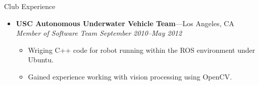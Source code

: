\documentclass[8pt,oneside]{article}
\newenvironment{ressection}[1]{
	\vspace{4pt}
	{\fontfamily{phv}\selectfont\large#1}
	\begin{itemize}
	\vspace{3pt}
}{
	\end{itemize}
}
\newcommand{\resitem}[1]{
	\vspace{-4pt}
	\item \begin{flushleft} #1 \end{flushleft}
}
\newcommand{\ressubitem}[1]{
	\vspace{-1pt}
	\item \begin{flushleft} #1 \end{flushleft}
}
\newcommand{\resbigitem}[3]{
	\vspace{-5pt}
	\item
	\textbf{#1}---#2 \\
	\textit{#3}
}
\newcommand{\resshortbigitem}[2]{
	\vspace{-5pt}
	\item
	\textbf{#1}---#2
}
\newenvironment{ressubsec}[3]{
	\resbigitem{#1}{#2}{#3}
	\vspace{-2pt}
	\begin{itemize}
}{
	\end{itemize}
}
\begin{document}
\begin{ressection}{Club Experience}
	\begin{ressubsec}{USC Autonomous Underwater Vehicle Team}{Los Angeles, CA}{Member of Software Team September 2010--May 2012}
		\ressubitem{Wriging C++ code for robot running within the ROS environment under Ubuntu.}
		\ressubitem{Gained experience working with vision processing using OpenCV.}
	\end{ressubsec}
\end{ressection}







	
	

\end{document}
